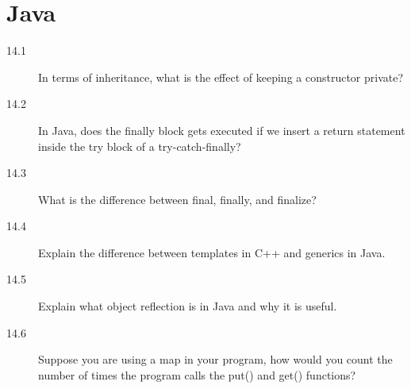 \chapter{Java}

\begin{description}
\item[14.1] In terms of inheritance, what is the effect of keeping a constructor private?
%


\item[14.2] In Java, does the finally block gets executed if we insert a return statement inside the try block of a try-catch-finally?
%


\item[14.3] What is the difference between final, finally, and finalize?
%


\item[14.4] Explain the difference between templates in C++ and generics in Java.
%


\item[14.5] Explain what object reflection is in Java and why it is useful.	
%


\item[14.6] Suppose you are using a map in your program, how would you count the number of times the program calls the put() and get() functions?	
%

\end{description}
